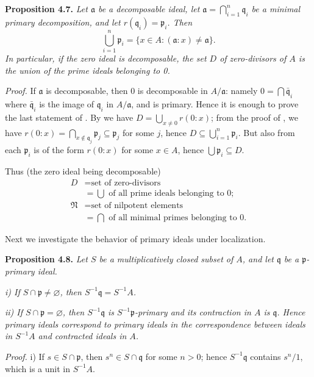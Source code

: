 \noindent\textbf{Proposition 4.7.} \emph{Let \(\mathfrak a\) be a decomposable ideal, let \(\mathfrak a=\bigcap_{i=1}^n\mathfrak q_i\) be a minimal primary decomposition, and let \(r(\mathfrak q_i)=\mathfrak p_i\). Then}
\[
\bigcup_{i=1}^n\mathfrak p_i=\{x\in A:(\mathfrak a:x)\neq\mathfrak a\}.
\]
\emph{In particular, if the zero ideal is decomposable, the set \(D\) of zero-divisors of \(A\) is the union of the prime ideals belonging to 0.}

\noindent\emph{Proof.} If \(\mathfrak a\) is decomposable, then 0 is decomposable in \(A/\mathfrak a\): namely \(0=\bigcap\bar{\mathfrak q}_i\) where \(\bar{\mathfrak q}_i\) is the image of \(\mathfrak q_i\) in \(A/\mathfrak a\), and is primary. Hence it is enough to prove the last statement of . By  we have \(D=\bigcup_{x\neq0}r(0:x)\); from the proof of , we have \(r(0:x)=\bigcap_{x\notin\mathfrak q_j}\mathfrak p_j\subseteq\mathfrak p_j\) for some \(j\), hence \(D\subseteq\bigcup_{i=1}^n\mathfrak p_i\). But also from  each \(\mathfrak p_i\) is of the form \(r(0:x)\) for some \(x\in A\), hence \(\bigcup\mathfrak p_i\subseteq D\). \proofbox

Thus (the zero ideal being decomposable)
\[
\begin{aligned}
D&=\text{set of zero-divisors}\\
 &=\bigcup\text{ of all prime ideals belonging to }0;\\
\mathfrak N&=\text{set of nilpotent elements}\\
 &=\bigcap\text{ of all minimal primes belonging to }0.
\end{aligned}
\]

Next we investigate the behavior of primary ideals under localization.

\noindent\textbf{Proposition 4.8.} \emph{Let \(S\) be a multiplicatively closed subset of \(A\), and let \(\mathfrak q\) be a \(\mathfrak p\)-primary ideal.}

\emph{i) If \(S\cap\mathfrak p\neq\varnothing\), then \(S^{-1}\mathfrak q=S^{-1}A\).}

\emph{ii) If \(S\cap\mathfrak p=\varnothing\), then \(S^{-1}\mathfrak q\) is \(S^{-1}\mathfrak p\)-primary and its contraction in \(A\) is \(\mathfrak q\). Hence primary ideals correspond to primary ideals in the correspondence  between ideals in \(S^{-1}A\) and contracted ideals in \(A\).}

\noindent\emph{Proof.} i) If \(s\in S\cap\mathfrak p\), then \(s^n\in S\cap\mathfrak q\) for some \(n>0\); hence \(S^{-1}\mathfrak q\) contains \(s^n/1\), which is a unit in \(S^{-1}A\).


